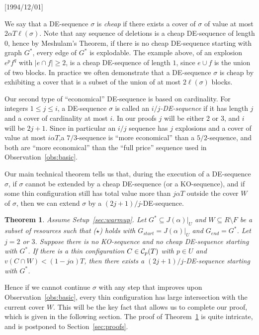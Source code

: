 \NeedsTeXFormat{LaTeX2e}[1994/12/01]\documentclass[letterpaper, 11pt]{article}
\newtheorem{thm}{Theorem}[section]
\theoremstyle{definition}
\theoremstyle{remark}
\numberwithin{equation}{section}
\begin{document}
We say that a DE-sequence $\sigma$ is {\it cheap} if
there exists a cover of $\sigma$ of value at most $2\alpha T \ell(\sigma)$.
Note that any sequence of deletions is a cheap DE-sequence of length $0$, hence 
by Meshulam's Theorem, if there is no cheap DE-sequence starting with graph $G^*$, every edge of $G^*$ is explodable.
The example above, of an explosion $e^pf^q$ with $|e\cap f| \geq 2$, is a cheap DE-sequence of length $1$, since $e\cup f$ is the union of two blocks.
In practice we often demonstrate that a DE-sequence $\sigma$ is cheap by exhibiting 
a cover that is a subset of the union of at most $2\ell (\sigma)$ blocks. 


Our second type of ``economical'' DE-sequence is based on cardinality. 
For integers $1\leq j\leq i$, a DE-sequence $\sigma$ is called
  an {\em $i/j$-DE-sequence} if it has length $j$ and a cover of
  cardinality at most $i$. In our proofs $j$ will be either 2 or 3,
  and $i$ will be $2j+1$. Since in particular an $i/j$ sequence has
  $j$ explosions and a
  cover of value at most $i\alpha T$,a $7/3$-sequence is
  ``more economical'' than a $5/2$-sequence, and both are ``more
  economical'' than the ``full price'' sequence used in
  Observation~\ref{obs:basic}.

Our main technical theorem tells us that, during the execution of a
DE-sequence $\sigma$, if $\sigma$ cannot be extended by a cheap DE-sequence 
(or a KO-sequence), and if some thin configuration still has
total value more than $j\alpha T$ outside the cover $W$ of $\sigma$, then we can
extend $\sigma$ by a $(2j+1)/j$-DE-sequence.


\begin{thm}\label{thm:jm}
Assume Setup~\ref{sec:warmup}. Let $G^* \subseteq  J(\alpha)|_U$ and  $W\subseteq R \setminus F$ be a subset of resources such
that ($\star$) holds with $G_{start}=J(\alpha)|_U$ and $G_{end}=G^*$.
Let $j=2$ or $3$. Suppose there is no
  KO-sequence and no cheap DE-sequence starting with $G^*$.
  If there is a thin configuration $C\in {\cal C}_p(T)$ with
  $p\in U$ and $v(C\cap W) < (1-j\alpha)T$, then there exists a $(2j+1)/j$-DE-sequence starting with $G^*$.
  \end{thm}
Hence if we cannot continue $\sigma$ with any step that improves upon
Observation~\ref{obs:basic}, every thin configuration has large
intersection with the current cover $W$. This will be the key fact
that allows us to complete our proof, which is given in the following section.
The proof of Theorem~\ref{thm:jm}
is quite intricate, and is postponed to Section~\ref{sec:proofs}. 
\end{document}
